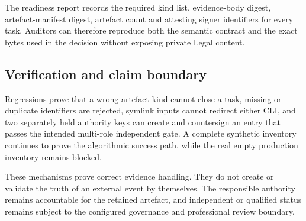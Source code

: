 The readiness report records the required kind list, evidence-body digest,
artefact-manifest digest, artefact count and attesting signer identifiers for every
task.  Auditors can therefore reproduce both the semantic contract and the exact
bytes used in the decision without exposing private Legal content.

\subsection{Verification and claim boundary}

Regressions prove that a wrong artefact kind cannot close a task, missing or
duplicate identifiers are rejected, symlink inputs cannot redirect either CLI,
and two separately held authority keys can create and countersign an entry that
passes the intended multi-role independent gate.  A complete synthetic inventory
continues to prove the algorithmic success path, while the real empty production
inventory remains blocked.

These mechanisms prove correct evidence handling.  They do not create or validate
the truth of an external event by themselves.  The responsible authority remains
accountable for the retained artefact, and independent or qualified status remains
subject to the configured governance and professional review boundary.
